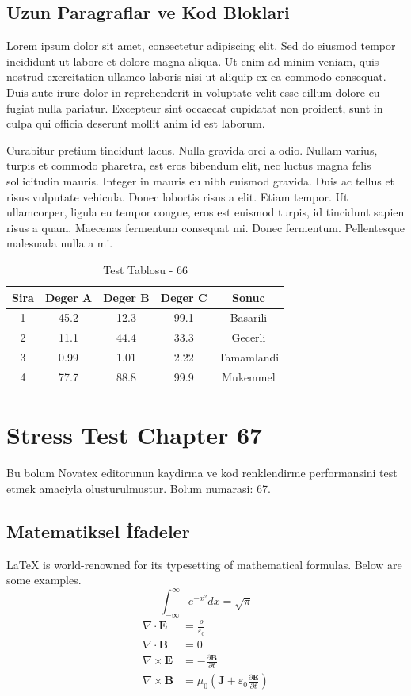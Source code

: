 \documentclass[12pt,a4paper]{article}
\begin{document}
\subsection{Uzun Paragraflar ve Kod Bloklari}
Lorem ipsum dolor sit amet, consectetur adipiscing elit. Sed do eiusmod tempor incididunt ut labore et dolore magna aliqua. Ut enim ad minim veniam, quis nostrud exercitation ullamco laboris nisi ut aliquip ex ea commodo consequat. Duis aute irure dolor in reprehenderit in voluptate velit esse cillum dolore eu fugiat nulla pariatur. Excepteur sint occaecat cupidatat non proident, sunt in culpa qui officia deserunt mollit anim id est laborum.

Curabitur pretium tincidunt lacus. Nulla gravida orci a odio. Nullam varius, turpis et commodo pharetra, est eros bibendum elit, nec luctus magna felis sollicitudin mauris. Integer in mauris eu nibh euismod gravida. Duis ac tellus et risus vulputate vehicula. Donec lobortis risus a elit. Etiam tempor. Ut ullamcorper, ligula eu tempor congue, eros est euismod turpis, id tincidunt sapien risus a quam. Maecenas fermentum consequat mi. Donec fermentum. Pellentesque malesuada nulla a mi.

\begin{table}[h!]
\centering
\begin{tabular}{|c|c|c|c|c|}
\hline
\textbf{Sira} & \textbf{Deger A} & \textbf{Deger B} & \textbf{Deger C} & \textbf{Sonuc} \\
\hline
1 & 45.2 & 12.3 & 99.1 & Basarili \\
2 & 11.1 & 44.4 & 33.3 & Gecerli \\
3 & 0.99 & 1.01 & 2.22 & Tamamlandi \\
4 & 77.7 & 88.8 & 99.9 & Mukemmel \\
\hline
\end{tabular}
\caption{Test Tablosu - 66}
\end{table}

\newpage
\section{Stress Test Chapter 67}
Bu bolum Novatex editorunun kaydirma ve kod renklendirme performansini test etmek amaciyla olusturulmustur. Bolum numarasi: 67.

\subsection{Matematiksel İfadeler}
\LaTeX{} is world-renowned for its typesetting of mathematical formulas. Below are some examples.
\begin{equation}
\int_{-\infty}^{\infty} e^{-x^2} dx = \sqrt{\pi}
\end{equation}
\begin{align}
\nabla \cdot \mathbf{E} &= \frac{\rho}{\varepsilon_0} \\
\nabla \cdot \mathbf{B} &= 0 \\
\nabla \times \mathbf{E} &= -\frac{\partial \mathbf{B}}{\partial t} \\
\nabla \times \mathbf{B} &= \mu_0\left(\mathbf{J} + \varepsilon_0 \frac{\partial \mathbf{E}}{\partial t}\right)
\end{align}
\end{document}
